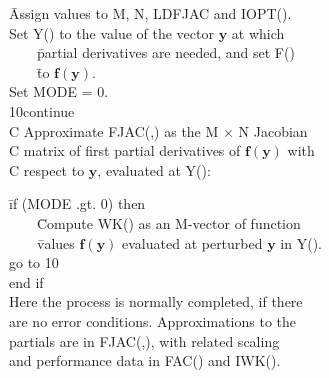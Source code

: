 \documentclass[twoside]{MATH77}
\begin{document}
\begin{tabbing}
\hspace{.2in}\=Assign values to M, N, LDFJAC  and IOPT().\\
\>Set Y() to the value of the vector $\mathbf{y}$ at which\\
\>\ \ \ \ \=partial derivatives are needed, and set F()\\
\>\ \ \ \ \=to $\mathbf{f}(\mathbf{y})$. \\
\>Set MODE = 0.\\
10\>continue \\

C Approximate FJAC(,) as the M $\times $ N Jacobian\\
C matrix of first partial derivatives of $\mathbf{f}(\mathbf{y})$ with\\
C respect to $\mathbf{y}$, evaluated at Y():

\end{tabbing}\vspace{-15pt}
\begin{center}
\end{center}
\begin{tabbing}
\hspace{.2in}\=if (MODE .gt. 0) then\\

\>\ \ \ \ \=Compute WK() as an M-vector of function\\
\>\>\ \ \ \ \=values $\mathbf{f}(\mathbf{y})$ evaluated at perturbed
$\mathbf{y}$ in Y().\\

\>\>go to 10\\
\>end if\\
\>Here the process is normally completed, if there \\
\>are no error conditions. Approximations to the\\
\> partials are in FJAC(,), with related scaling\\
\> and performance data in FAC() and IWK().\\
\end{tabbing}\vspace{-15pt}
\end{document}
